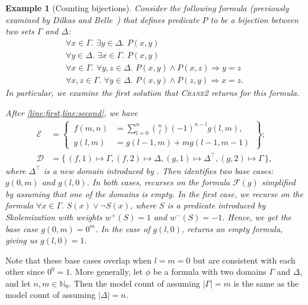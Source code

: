 \documentclass{article}
\newtheorem{example}{Example}
\theoremstyle{remark}
\newcommand{\Cranetwo}{\textsc{Crane2}}
\begin{document}
\begin{example}[Counting bijections]\label{example:overall}
  Consider the following formula (previously examined by Dilkas and
  Belle~) that defines predicate $P$ to be a
  bijection between two sets $\Gamma$ and $\Delta$:
  \[
    \begin{gathered}
      \forall x \in \Gamma\text{. }\exists y \in \Delta\text{. }P(x, y)\\
      \forall y \in \Delta\text{. }\exists x \in \Gamma\text{. }P(x, y)\\
      \forall x \in \Gamma\text{. }\forall y, z \in \Delta\text{. }P(x, y) \land P(x, z) \Rightarrow y = z\\
      \forall x, z \in \Gamma\text{. }\forall y \in \Delta\text{. }P(x, y) \land P(z, y) \Rightarrow x = z.
    \end{gathered}
  \]
  In particular, we examine the first solution that \Cranetwo{} returns for this
  formula.

  After \cref{line:first,line:second}, we have
  \begin{align*}
    \mathcal{E} &= \left\{\,\begin{aligned}f(m, n) &= \sum_{l=0}^{n} \binom{n}{l}{(-1)}^{n-l}g(l, m),\\ g(l, m) &= g(l-1, m) + mg(l-1, m-1)\end{aligned}\,\right\};\\
    \mathcal{D} &= \{\, (f, 1) \mapsto \Gamma, (f, 2) \mapsto \Delta, (g, 1) \mapsto \Delta^{\top}, (g, 2) \mapsto \Gamma \,\},
  \end{align*}
  where $\Delta^{\top}$ is a new domain introduced by \Compile. Then
  \FindBaseCases identifies two base cases: $g(0, m)$ and $g(l, 0)$. In both
  cases, \CompileWithBaseCases recurses on the formula $\mathcal{F}(g)$
  simplified by assuming that one of the domains is empty. In the first case, we
  recurse on the formula $\forall x \in \Gamma\text{. }S(x) \lor \neg S(x)$,
  where $S$ is a predicate introduced by Skolemization with weights
  $w^{+}(S) = 1$ and $w^{-}(S) = -1$. Hence, we get the base case
  $g(0, m) = 0^{m}$. In the case of $g(l, 0)$, 
  returns an empty formula, giving us $g(l, 0) = 1$.
\end{example}

Note that these base cases overlap when $l = m = 0$ but are consistent with each
other since $0^{0} = 1$. More generally, let $\phi$ be a formula with two
domains $\Gamma$ and $\Delta$, and let $n, m \in \mathbb{N}_{0}$. Then the model
count of  assuming $|\Gamma| = m$ is the same
as the model count of  assuming $|\Delta| = n$.
\end{document}
